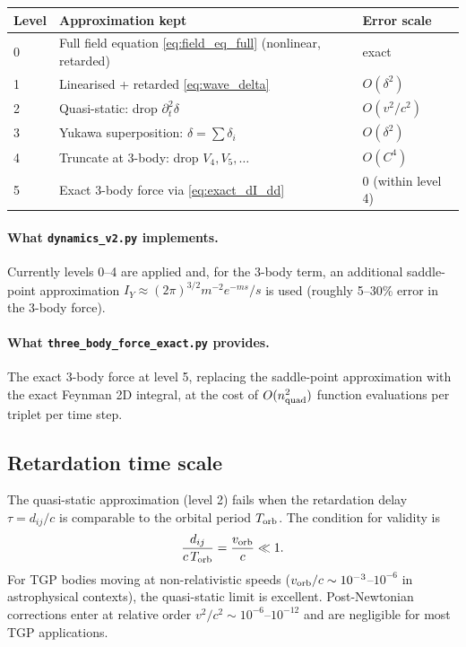 \begin{center}
\begin{tabular}{lll}
\hline
Level & Approximation kept & Error scale\\
\hline
0 & Full field equation \eqref{eq:field_eq_full} (nonlinear, retarded) & exact\\
1 & Linearised + retarded \eqref{eq:wave_delta} & $O(\delta^2)$\\
2 & Quasi-static: drop $\partial_t^2\delta$ & $O(v^2/c^2)$\\
3 & Yukawa superposition: $\delta=\sum \delta_i$ & $O(\delta^2)$\\
4 & Truncate at 3-body: drop $V_4,V_5,\ldots$ & $O(C^4)$\\
5 & Exact 3-body force via \eqref{eq:exact_dI_dd} & $0$ (within level 4)\\
\hline
\end{tabular}
\end{center}

\paragraph{What \texttt{dynamics\_v2.py} implements.}
Currently levels 0--4 are applied and, for the 3-body term, an
additional saddle-point approximation $I_Y \approx (2\pi)^{3/2}m^{-2}
e^{-ms}/s$ is used (roughly 5--30\% error in the 3-body force).

\paragraph{What \texttt{three\_body\_force\_exact.py} provides.}
The exact 3-body force at level 5, replacing the saddle-point
approximation with the exact Feynman 2D integral, at the cost of
$O(n_{\rm quad}^2)$ function evaluations per triplet per time step.

\subsection{Retardation time scale}

The quasi-static approximation (level 2) fails when the retardation
delay $\tau = d_{ij}/c$ is comparable to the orbital period $T_{\rm orb}$.
The condition for validity is
\begin{equation}
\frac{d_{ij}}{c\,T_{\rm orb}} = \frac{v_{\rm orb}}{c} \ll 1.
\end{equation}
For TGP bodies moving at non-relativistic speeds ($v_{\rm orb}/c \sim
10^{-3}$--$10^{-6}$ in astrophysical contexts), the quasi-static limit is
excellent.  Post-Newtonian corrections enter at relative order $v^2/c^2
\sim 10^{-6}$--$10^{-12}$ and are negligible for most TGP applications.

